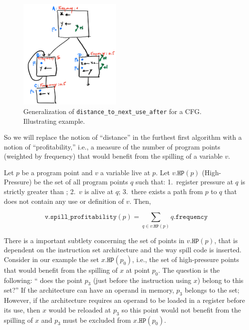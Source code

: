 {\begin{figure}
  \includegraphics[width=0.45\textwidth]{figures/priority-spill-CFG.pdf}

  \caption{Generalization of \texttt{distance\_to\_next\_use\_after} for a CFG. Illustrating example.}
  \label{fig:ra:priority-spill-CFG}
\end{figure}

So we will replace the notion of ``distance'' in the furthest first algorithm with a notion of ``profitability,'' i.e., a measure of the number of program points (weighted by frequency) that would benefit from the spilling of a variable $v$.

%
%

\begin{definition}
%
  Let $p$ be a program point and $v$ a variable live at $p$.
  Let $v.\texttt{HP}(p)$ (High-Pressure) be the set of all program points $q$ such that:
  1.~register pressure at $q$ is strictly greater than \regs;
  2.~$v$ is alive at $q$;
  3.~there exists a path from $p$ to $q$ that does not contain any use or definition of $v$.
  Then,

  $$\texttt{v.spill\_profitability}(p) = \sum_{q\in v.\texttt{HP}(p)} q.\texttt{frequency}$$
\end{definition}

There is a important subtlety concerning the set of points in $v.\texttt{HP}(p)$, that is dependent on the instruction set architecture and the way spill code is inserted.
Consider in our example the set $x.\texttt{HP}(p_0)$, i.e., the set of high-pressure points that would benefit from the spilling of $x$ at point $p_0$.
The question is the following: `` does the point $p_3$ (just before the instruction using $x$) belong to this set?''
If the architecture can have an operand in memory, $p_3$ belongs to the set;
However, if the architecture requires an operand to be loaded in a register before its use, then $x$ would be reloaded at $p_3$ so this point would not benefit from the spilling of $x$ and $p_3$ must be excluded from $x.\texttt{HP}(p_0)$.

}
